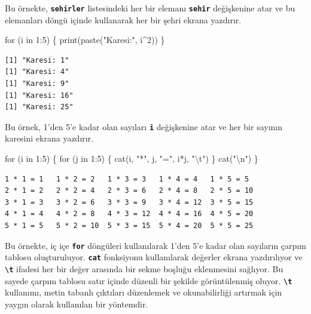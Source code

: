 \documentclass[
  letterpaper,
  DIV=11,
  numbers=noendperiod]{scrreprt}
\newenvironment{Shaded}{\begin{snugshade}}{\end{snugshade}}
\newcommand{\ControlFlowTok}[1]{\textcolor[rgb]{0.00,0.23,0.31}{#1}}
\newcommand{\DecValTok}[1]{\textcolor[rgb]{0.68,0.00,0.00}{#1}}
\newcommand{\FunctionTok}[1]{\textcolor[rgb]{0.28,0.35,0.67}{#1}}
\newcommand{\NormalTok}[1]{\textcolor[rgb]{0.00,0.23,0.31}{#1}}
\newcommand{\SpecialCharTok}[1]{\textcolor[rgb]{0.37,0.37,0.37}{#1}}
\newcommand{\StringTok}[1]{\textcolor[rgb]{0.13,0.47,0.30}{#1}}
\begin{document}
Bu örnekte, \textbf{\texttt{sehirler}} listesindeki her bir elemanı
\textbf{\texttt{sehir}} değişkenine atar ve bu elemanları döngü içinde
kullanarak her bir şehri ekrana yazdırır.

\begin{Shaded}
\begin{Highlighting}[]
\ControlFlowTok{for}\NormalTok{ (i }\ControlFlowTok{in} \DecValTok{1}\SpecialCharTok{:}\DecValTok{5}\NormalTok{) \{}
  \FunctionTok{print}\NormalTok{(}\FunctionTok{paste}\NormalTok{(}\StringTok{"Karesi:"}\NormalTok{, i}\SpecialCharTok{\^{}}\DecValTok{2}\NormalTok{))}
\NormalTok{\}}
\end{Highlighting}
\end{Shaded}

\begin{verbatim}
[1] "Karesi: 1"
[1] "Karesi: 4"
[1] "Karesi: 9"
[1] "Karesi: 16"
[1] "Karesi: 25"
\end{verbatim}

Bu örnek, 1'den 5'e kadar olan sayıları \textbf{\texttt{i}} değişkenine
atar ve her bir sayının karesini ekrana yazdırır.

\begin{Shaded}
\begin{Highlighting}[]
\ControlFlowTok{for}\NormalTok{ (i }\ControlFlowTok{in} \DecValTok{1}\SpecialCharTok{:}\DecValTok{5}\NormalTok{) \{}
  \ControlFlowTok{for}\NormalTok{ (j }\ControlFlowTok{in} \DecValTok{1}\SpecialCharTok{:}\DecValTok{5}\NormalTok{) \{}
    \FunctionTok{cat}\NormalTok{(i, }\StringTok{"*"}\NormalTok{, j, }\StringTok{"="}\NormalTok{, i}\SpecialCharTok{*}\NormalTok{j, }\StringTok{"}\SpecialCharTok{\textbackslash{}t}\StringTok{"}\NormalTok{)}
\NormalTok{  \}}
  \FunctionTok{cat}\NormalTok{(}\StringTok{"}\SpecialCharTok{\textbackslash{}n}\StringTok{"}\NormalTok{)}
\NormalTok{\}}
\end{Highlighting}
\end{Shaded}

\begin{verbatim}
1 * 1 = 1   1 * 2 = 2   1 * 3 = 3   1 * 4 = 4   1 * 5 = 5   
2 * 1 = 2   2 * 2 = 4   2 * 3 = 6   2 * 4 = 8   2 * 5 = 10  
3 * 1 = 3   3 * 2 = 6   3 * 3 = 9   3 * 4 = 12  3 * 5 = 15  
4 * 1 = 4   4 * 2 = 8   4 * 3 = 12  4 * 4 = 16  4 * 5 = 20  
5 * 1 = 5   5 * 2 = 10  5 * 3 = 15  5 * 4 = 20  5 * 5 = 25  
\end{verbatim}

Bu örnekte, iç içe \textbf{\texttt{for}} döngüleri kullanılarak 1'den
5'e kadar olan sayıların çarpım tablosu oluşturuluyor.
\textbf{\texttt{cat}} fonksiyonu kullanılarak değerler ekrana
yazdırılıyor ve \textbf{\texttt{\textbackslash{}t}} ifadesi her bir
değer arasında bir sekme boşluğu eklenmesini sağlıyor. Bu sayede çarpım
tablosu satır içinde düzenli bir şekilde görüntülenmiş oluyor.
\textbf{\texttt{\textbackslash{}t}} kullanımı, metin tabanlı çıktıları
düzenlemek ve okunabilirliği artırmak için yaygın olarak kullanılan bir
yöntemdir.
\end{document}
